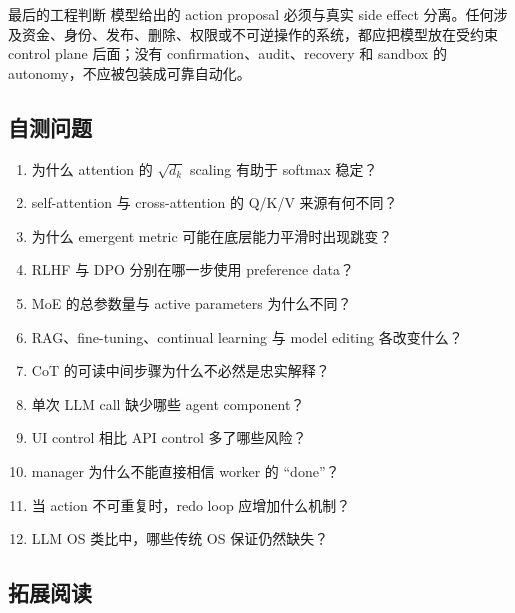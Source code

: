 \begin{warningbox}{最后的工程判断}
模型给出的 action proposal 必须与真实 side effect 分离。任何涉及资金、身份、发布、删除、权限或不可逆操作的系统，都应把模型放在受约束 control plane 后面；没有 confirmation、audit、recovery 和 sandbox 的 autonomy，不应被包装成可靠自动化。
\end{warningbox}

\subsection{自测问题}

\begin{enumerate}
  \item 为什么 attention 的 $\sqrt{d_k}$ scaling 有助于 softmax 稳定？
  \item self-attention 与 cross-attention 的 Q/K/V 来源有何不同？
  \item 为什么 emergent metric 可能在底层能力平滑时出现跳变？
  \item RLHF 与 DPO 分别在哪一步使用 preference data？
  \item MoE 的总参数量与 active parameters 为什么不同？
  \item RAG、fine-tuning、continual learning 与 model editing 各改变什么？
  \item CoT 的可读中间步骤为什么不必然是忠实解释？
  \item 单次 LLM call 缺少哪些 agent component？
  \item UI control 相比 API control 多了哪些风险？
  \item manager 为什么不能直接相信 worker 的 ``done''？
  \item 当 action 不可重复时，redo loop 应增加什么机制？
  \item LLM OS 类比中，哪些传统 OS 保证仍然缺失？
\end{enumerate}

\subsection{拓展阅读}


